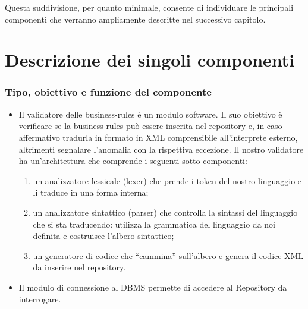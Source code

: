 \documentclass[11pt,titlepage,a4paper]{report}
\begin{document}
Questa suddivisione, per quanto minimale, consente di individuare le principali componenti che verranno ampliamente descritte nel successivo capitolo.

\chapter{Descrizione dei singoli componenti}
\subsection{Tipo, obiettivo e funzione del componente}

\begin{itemize}
\item Il validatore delle business-rules \`e un modulo software. Il suo obiettivo \`e verificare se la business-rules pu\`o essere inserita nel repository e, in caso affermativo tradurla in formato in XML comprensibile all'interprete esterno, altrimenti segnalare l'anomalia con la rispettiva eccezione. Il nostro validatore ha un'architettura che comprende i seguenti sotto-componenti:
\begin{enumerate}
\item un analizzatore lessicale (lexer) che prende i token del nostro linguaggio e li traduce in una forma interna;

\item un analizzatore sintattico (parser) che controlla la sintassi del linguaggio che si sta traducendo: utilizza la grammatica del linguaggio da noi definita e costruisce l'albero sintattico;
\item un generatore di codice che ``cammina'' sull'albero e genera il codice XML da inserire nel repository.
\end{enumerate}

\item Il modulo di connessione al DBMS permette di accedere al Repository da interrogare.


\end{itemize}
\end{document}
